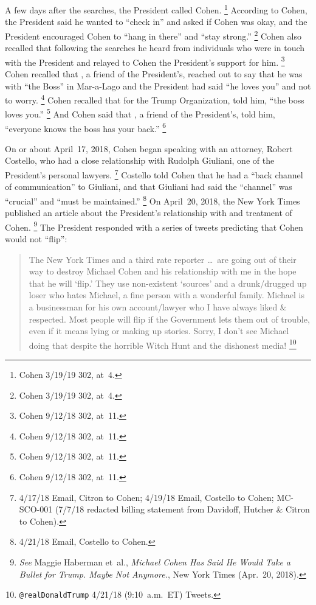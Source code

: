 A few days after the searches, the President called Cohen.%
\footnote{Cohen 3/19/19 302, at~4.}
According to Cohen, the President said he wanted to ``check in'' and asked if Cohen was okay, and the President encouraged Cohen to ``hang in there'' and ``stay strong.''%
\footnote{Cohen 3/19/19 302, at~4.}
Cohen also recalled that following the searches he heard from individuals who were in touch with the President and relayed to Cohen the President's support for him.%
\footnote{Cohen 9/12/18 302, at~11.}
Cohen recalled that , a friend of the President's, reached out to say that he was with ``the Boss'' in Mar-a-Lago and the President had said ``he loves you'' and not to worry.%
\footnote{Cohen 9/12/18 302, at~11.}
Cohen recalled that  for the Trump Organization, told him, ``the boss loves you.''%
\footnote{Cohen 9/12/18 302, at~11.}
And Cohen said that , a friend of the President's, told him, ``everyone knows the boss has your back.''%
\footnote{Cohen 9/12/18 302, at~11.}

On or about April~17, 2018, Cohen began speaking with an attorney, Robert Costello, who had a close relationship with Rudolph Giuliani, one of the President's personal lawyers.%
\footnote{4/17/18 Email, Citron to Cohen;
4/19/18 Email, Costello to Cohen;
MC-SCO-001 (7/7/18 redacted billing statement from Davidoff, Hutcher \& Citron to Cohen).}
Costello told Cohen that he had a ``back channel of communication'' to Giuliani, and that Giuliani had said the ``channel'' was ``crucial'' and ``must be maintained.''%
\footnote{4/21/18 Email, Costello to Cohen.}
On April~20, 2018, the New York Times published an article about the President's relationship with and treatment of Cohen.%
\footnote{\textit{See} Maggie Haberman et~al., \textit{Michael Cohen Has Said He Would Take a Bullet for Trump. Maybe Not Anymore.}, New York Times (Apr.~20, 2018).}
The President responded with a series of tweets predicting that Cohen would not ``flip'':

\begin{quote}
The New York Times and a third rate reporter \dots\ are going out of their way to destroy Michael Cohen and his relationship with me in the hope that he will `flip.'
They use non-existent `sources' and a drunk/drugged up loser who hates Michael, a fine person with a wonderful family.
Michael is a businessman for his own account/lawyer who I have always liked \& respected.
Most people will flip if the Government lets them out of trouble, even if it means lying or making up stories.
Sorry, I don't see Michael doing that despite the horrible Witch Hunt and the dishonest media!%
\footnote{\verb+@realDonaldTrump+ 4/21/18 (9:10~a.m.~ET) Tweets.}
\end{quote}

